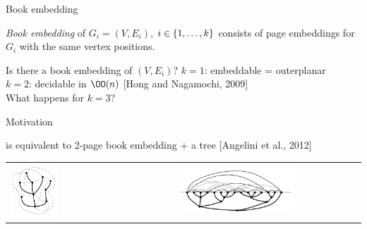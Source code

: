 \begin{frame}{Book embedding}

\begin{definition}
\emph{Book embedding} of $G_i = (V, E_i)$, $i \in \{1, \dotsc, k\}$ consists of 
page embeddings for~$G_i$ with the same vertex positions.
\end{definition}

\begin{overprint}
\begin{figure}
\centering

\end{figure}


{Is there a book embedding of $(V, E_i)$?}
$k = 1$: embeddable = outerplanar\\
$k = 2$: decidable in $\OO(n)$ [Hong and Nagamochi, 2009]\\
What happens for $k = 3$?
\end{overprint}
\end{frame}

\begin{frame}{Motivation}

is equivalent to 2-page book embedding + a tree [Angelini et al., 2012]
\begin{tabular}{m{}m{}}
  \includegraphics[width=0.3\textwidth]{sefe1} &
  \includegraphics[width=0.65\textwidth]{sefe2}
\end{tabular}
\end{frame}


